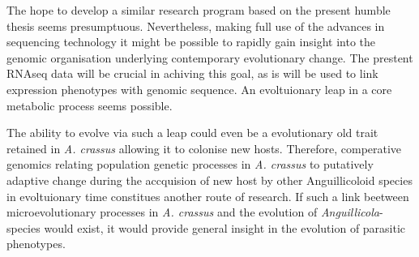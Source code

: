 The hope to develop a similar research program based on the present
humble thesis seems presumptuous. Nevertheless, making full use of the
advances in sequencing technology it might be possible to rapidly gain
insight into the genomic organisation underlying contemporary
evolutionary change. The prestent RNAseq data will be crucial in
achiving this goal, as is will be used to link expression phenotypes
with genomic sequence. An evoltuionary leap in a core metabolic
process seems possible.

The ability to evolve via such a leap could even be a evolutionary old
trait retained in \textit{A. crassus} allowing it to colonise new
hosts. Therefore, comperative genomics relating population genetic
processes in \textit{A. crassus} to putatively adaptive change during
the accquision of new host by other Anguillicoloid species in
evoltuionary time constitues another route of research. If such a link
beetween microevolutionary processes in \textit{A. crassus} and the
evolution of \textit{Anguillicola}-species would exist, it would
provide general insight in the evolution of parasitic phenotypes.






